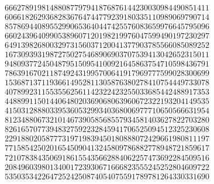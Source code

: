 \begin{ProjectEuler}{13}
\begin{multicols}{2}
\begin{align*}
	66627891981488087797941876876144230030984490851411 \\
	60661826293682836764744779239180335110989069790714 \\
	85786944089552990653640447425576083659976645795096 \\
	66024396409905389607120198219976047599490197230297 \\
	64913982680032973156037120041377903785566085089252 \\
	16730939319872750275468906903707539413042652315011 \\
	94809377245048795150954100921645863754710598436791 \\
	78639167021187492431995700641917969777599028300699 \\
	15368713711936614952811305876380278410754449733078 \\
	40789923115535562561142322423255033685442488917353 \\
	44889911501440648020369068063960672322193204149535 \\
	41503128880339536053299340368006977710650566631954 \\
	81234880673210146739058568557934581403627822703280 \\
	82616570773948327592232845941706525094512325230608 \\
	22918802058777319719839450180888072429661980811197 \\
	77158542502016545090413245809786882778948721859617 \\
	72107838435069186155435662884062257473692284509516 \\
	20849603980134001723930671666823555245252804609722 \\
	53503534226472524250874054075591789781264330331690 
\end{align*}
\endgroup
\end{multicols}
%
\end{ProjectEuler}

